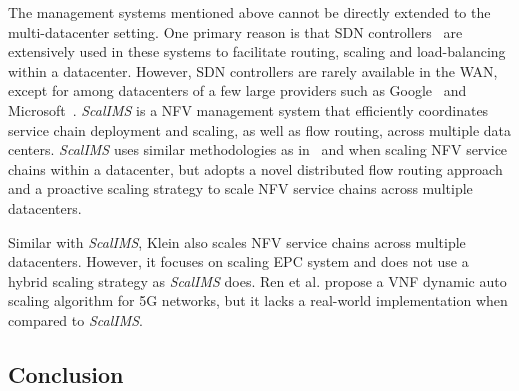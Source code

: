 The management systems mentioned above cannot be directly extended to the multi-datacenter setting. One primary reason is that SDN controllers~\cite{mckeown2008openflow} are extensively used in these systems to facilitate routing, scaling and load-balancing within a datacenter. However, SDN controllers are rarely available in the WAN, except for among datacenters of a few large providers such as Google~\cite{jain2013b4} and Microsoft~\cite{hong2013achieving}.
 \textit{ScalIMS} is a NFV management system that efficiently coordinates service chain deployment and scaling, as well as flow routing, across multiple data centers. \textit{ScalIMS} uses similar methodologies as in~\cite{palkar2015e2} and \cite{gember2012stratos} when scaling NFV service chains within a datacenter, but adopts a novel distributed flow routing approach and a proactive scaling strategy to scale NFV service chains across multiple datacenters.

Similar with \textit{ScalIMS}, Klein \cite{qazi2016klein} also scales NFV service chains across multiple datacenters. However, it focuses on scaling EPC system \cite{epc} and does not use a hybrid scaling strategy as \textit{ScalIMS} does. Ren et al. \cite{ren2016dynamic} propose a VNF dynamic auto scaling algorithm for 5G networks, but it lacks a real-world implementation when compared to \textit{ScalIMS}.

\subsection{Conclusion}

